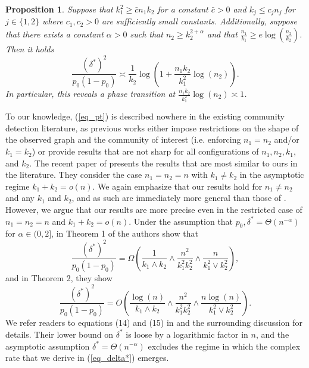 \documentclass{article}
\newtheorem{proposition}{Proposition}
\begin{document}
\begin{proposition}\label{prop_example}
Suppose that $k_1^2 \geq \bar{c}n_1 k_2$ for a constant $\bar{c} > 0$ and $k_j \leq c_j n_j$ for $j \in \{1, 2\}$ where $c_1,c_2 > 0$ are sufficiently small constants. Additionally, suppose that there exists a constant $\alpha > 0$ such that $n_2 \geq k_2^{2 + \alpha}$ and that $\frac{n_1}{k_1} \geq e \log(\frac{n_2}{k_2})$. Then it holds
\begin{equation}\label{eq_pt}
    \frac{(\delta^*)
^2}{p_0(1-p_0)} \asymp \frac{1}{k_2}\log\left(1 + \frac{n_1k_2}{k_1^2}\log(n_2)\right).
\end{equation}
In particular, this reveals a phase transition at $\frac{n_1k_2}{k_1^2}\log(n_2)\asymp 1$.
\end{proposition}
To our knowledge, (\ref{eq_pt}) is described nowhere in the existing community detection literature, as previous works either impose restrictions on the shape of the observed graph and the community of interest (i.e. enforcing $n_1 = n_2$ and/or $k_1 = k_2$) or provide results that are not sharp for all configurations of $n_1, n_2, k_1$, and $k_2$. The recent paper of \cite{rotenberg2024planted} presents the results that are most similar to ours in the literature. They consider the case $n_1 = n_2 = n$ with $k_1 \neq k_2$ in the asymptotic regime $k_1 + k_2 = o(n)$. We again emphasize that our results hold for $n_1 \neq n_2$ and any $k_1$ and $k_2$, and as such are immediately more general than those of \cite{rotenberg2024planted}. However, we argue that our results are more precise even in the restricted case of $n_1 = n_2 = n$ and $k_1 + k_2 = o(n)$. Under the assumption that $p_0, \delta^* = \Theta(n^{-\alpha})$ for $\alpha \in (0,2]$, in Theorem 1 of \cite{rotenberg2024planted} the authors show that 
\[\frac{(\delta^*)^2}{p_0(1-p_0)} = \Omega\left(\frac{1}{k_1 \land k_2} \land \frac{n^2}{k_1^2 k_2^2} \land \frac{n}{k_1^2 \lor k_2^2}\right),\]
and in Theorem 2, they show
\[\frac{(\delta^*)^2}{p_0(1-p_0)} = O \left(\frac{\log (n)}{k_1 \land k_2} \land \frac{n^2}{k_1^2 k_2^2} \land \frac{n\log(n)}{k_1^2 \lor k_2^2}\right).\]
We refer readers to equations (14) and (15) in \cite{rotenberg2024planted} and the surrounding discussion for details. 
Their lower bound on $\delta^*$ is loose by a logarithmic factor in $n$, and the asymptotic assumption $\delta^* = \Theta(n^{-\alpha})$ excludes the regime in which the complex rate that we derive in (\ref{eq_delta*}) emerges. 
\end{document}
